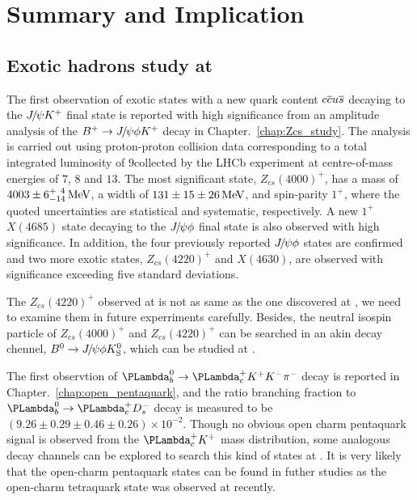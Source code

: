 \chapter{Summary and Implication}
\label{chap:summary}

\section{Exotic hadrons study at \lhcb}

The first observation of exotic states with a new quark content ${{c}{\overline {{c}}}} u{\overline {{s}}}$ decaying to the ${{J\mskip -3mu/\mskip -2mu\psi}} K^+$ final state is reported 
with high significance from an amplitude analysis of the ${{{B}^+}} \rightarrow {\ensuremath{{J\mskip -3mu/\mskip -2mu\psi}}} \phi K^+$ decay in Chapter.~\ref{chap:Zcs_study}. 
The analysis is carried out using proton-proton collision data corresponding to a total integrated luminosity of 9\invfb collected 
by the LHCb experiment at centre-of-mass energies of $7$, $8$ and $13$\tev. 
The most significant state, $Z_{cs}(4000)^+$, 
has a mass of $4003\pm6^{+\phantom{0}4}_{-14}\text{\,Me\kern -0.1em V}$, 
a width of $131\pm15\pm26\text{\,Me\kern -0.1em V}$, 
and spin-parity $1^+$, where the quoted uncertainties are statistical and systematic, respectively. 
A new $1^+$ $X(4685)$ state decaying to the ${{J\mskip -3mu/\mskip -2mu\psi}} \phi$ final state is also observed with high significance.
In addition, 
the four previously reported ${{J\mskip -3mu/\mskip -2mu\psi}} \phi$ states are confirmed and two more exotic states, $Z_{cs}(4220)^+$ and $X(4630)$,  
are observed with significance exceeding five standard deviations.

The $Z_{cs}(4220)^+$ observed at \lhcb is not as same as the one discovered at \besiii,
we need to examine them in future experriments carefully.
Besides,
the neutral isospin particle of $Z_{cs}(4000)^+$ and $Z_{cs}(4220)^+$ can be searched in an akin decay chennel,
${{B}^0}\rightarrow{\ensuremath{{J\mskip -3mu/\mskip -2mu\psi}}}\phi{\ensuremath{{K}^0_{\mathrm{S}}}}$,
which can be studied at \lhcb.


The first observtion of $\Lb\to\Lc\Kp\Km\pim$ decay is reported in Chapter.~\ref{chap:open_pentaquark},
and the ratio branching fraction to $\Lb\to\Lc\Dsm$ decay is measured to be $(9.26 \pm 0.29 \pm 0.46 \pm 0.26)\times10^{-2}$. 
Though no obvious open charm pentaquark signal is observed from the $\Lc\Kp$ mass distribution,
some analogous decay channels can be explored to search this kind of states at \lhcb.
It is very likely that the open-charm pentaquark states can be found in futher studies
as the open-charm tetraquark state was observed at \lhcb recently\supercite{LHCb-PAPER-2020-015}. 

